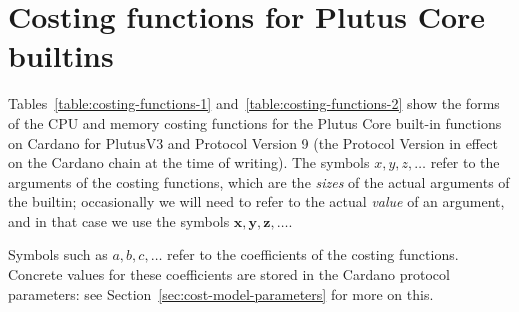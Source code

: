 \documentclass[a4paper]{article}
\begin{document}
\section{Costing functions for Plutus Core builtins}
Tables~\ref{table:costing-functions-1} and~\ref{table:costing-functions-2} show
the forms of the CPU and memory costing functions for the Plutus Core built-in
functions on Cardano for PlutusV3 and Protocol Version 9 (the Protocol Version
in effect on the Cardano chain at the time of writing).  The symbols $x, y,
z, \ldots$ refer to the arguments of the costing functions, which are the
\textit{sizes} of the actual arguments of the builtin; occasionally we will need
to refer to the actual \textit{value} of an argument, and in that case we use
the symbols $\mathbf{x}, \mathbf{y}, \mathbf{z}, \ldots$.

Symbols such as $a, b, c, \ldots$ refer to the coefficients of the costing
functions.  Concrete values for these coefficients are stored in the Cardano
protocol parameters: see Section~\ref{sec:cost-model-parameters} for more on
this.
%
\end{document}
